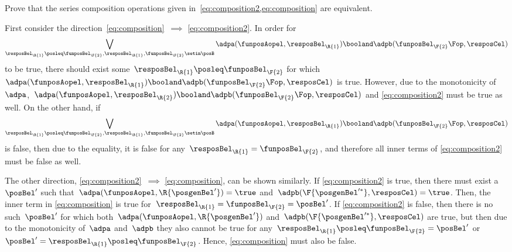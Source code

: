 \begin{exercise}
    \label{ex:composition_equivalency}
    Prove that the series composition operations given in~\cref{eq:composition2,eq:composition} are equivalent.
\end{exercise}
%
\begin{solution}
    First consider the direction~\cref{eq:composition}~$\implies$ \cref{eq:composition2}.
    In order for%
    \begin{equation}
        \bigvee_{\resposBel_\R{1}\posleq\funposBel_\F{2}, \resposBel_\R{1},\funposBel_\F{2}\setin \posB} \adpa(\funposAopel,\resposBel_\R{1}) \booland \adpb(\funposBel_\F{2}\Fop,\resposCel)%
    \end{equation}
    to be true, there should exist some~$\resposBel_\R{1}\posleq \funposBel_\F{2}$ for which~$\adpa(\funposAopel,\resposBel_\R{1}) \booland\adpb(\funposBel_\F{2}\Fop,\resposCel)$ is true.
    However, due to the monotonicity of~$\adpa$,~$\adpa(\funposAopel,\resposBel_\R{2}) \booland \adpb(\funposBel_\F{2}\Fop,\resposCel)$ and \cref{eq:composition2} must be true as well.
    On the other hand, if%
    \begin{equation}
        \bigvee_{\resposBel_\R{1}\posleq\funposBel_\F{2}, \resposBel_\R{1},\funposBel_\F{2}\setin \posB} \adpa(\funposAopel,\resposBel_\R{1}) \booland \adpb(\funposBel_\F{2}\Fop,\resposCel)%
    \end{equation}
    is false, then due to the equality, it is false for any~$\resposBel_\R{1}=\funposBel_\F{2}$, and therefore all inner terms of \cref{eq:composition2} must be false as well.

    The other direction, \cref{eq:composition2}~$\implies$ \cref{eq:composition}, can be shown similarly.
    If \cref{eq:composition2} is true, then there must exist a~$\posBel'$ such that~$\adpa(\funposAopel, \R{\posgenBel'})=\true$ and~$\adpb(\F{\posgenBel'^*}, \resposCel)=\true$.
    Then, the inner term in \cref{eq:composition} is true for~$\resposBel_\R{1}=\funposBel_\F{2}=\posBel'$.
    If \cref{eq:composition2} is false, then there is no such~$\posBel'$ for which both~$\adpa(\funposAopel, \R{\posgenBel'})$ and~$\adpb(\F{\posgenBel'^*}, \resposCel)$ are true, but then due to the monotonicity of~$\adpa$ and~$\adpb$ they also cannot be true for any~$\resposBel_\R{1} \posleq \funposBel_\F{2} = \posBel'$ or~$\posBel'=\resposBel_\R{1} \posleq \funposBel_\F{2}$.
    Hence, \cref{eq:composition} must also be false.
\end{solution}

